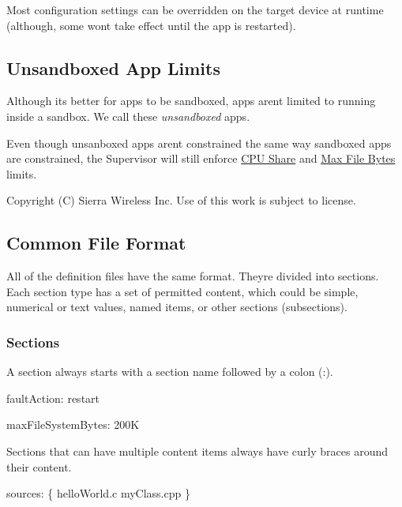 Most configuration settings can be overridden on the target device at runtime (although, some won\textquotesingle{}t take effect until the app is restarted).\hypertarget{def_files_overview_defFilesOverview_unsandboxedApps}{}\subsection{Unsandboxed App Limits}\label{def_files_overview_defFilesOverview_unsandboxedApps}
Although it\textquotesingle{}s better for apps to be sandboxed, apps aren\textquotesingle{}t limited to running inside a sandbox. We call these {\itshape unsandboxed} apps.

Even though unsanboxed apps aren\textquotesingle{}t constrained the same way sandboxed apps are constrained, the Supervisor will still enforce \hyperlink{def_files_adef_defFilesAdef_cpuShare}{C\+P\+U Share} and \hyperlink{def_files_adef_defFilesAdef_processMaxFileBytes}{Max File Bytes} limits.





Copyright (C) Sierra Wireless Inc. Use of this work is subject to license. \hypertarget{defFilesFormat}{}\subsection{Common File Format}\label{defFilesFormat}
All of the definition files have the same format. They\textquotesingle{}re divided into sections. Each section type has a set of permitted content, which could be simple, numerical or text values, named items, or other sections (subsections).\hypertarget{def_files_format_defFileFormatSections}{}\subsubsection{Sections}\label{def_files_format_defFileFormatSections}
A section always starts with a section name followed by a colon (\textquotesingle{}\+:\textquotesingle{}).


\begin{DoxyCode}
faultAction: restart

maxFileSystemBytes: 200K
\end{DoxyCode}


Sections that can have multiple content items always have curly braces around their content.


\begin{DoxyCode}
sources:
\{
    helloWorld.c
    myClass.cpp
\}
\end{DoxyCode}


